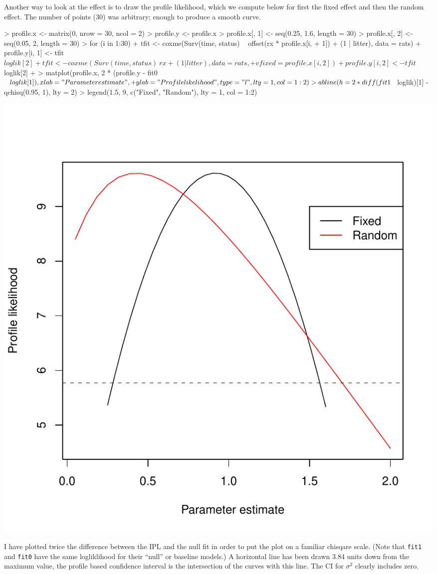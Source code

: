 \documentclass{article}
\begin{document}
Another way to look at the effect is to draw the profile likelihood,
which we compute below for first the fixed effect and then the  random effect.
The number of points (30) was arbitrary; enough to produce a smooth curve.
\begin{Schunk}
\begin{Sinput}
> profile.x <- matrix(0, nrow = 30, ncol = 2)
> profile.y <- profile.x
> profile.x[, 1] <- seq(0.25, 1.6, length = 30)
> profile.x[, 2] <- seq(0.05, 2, length = 30)
> for (i in 1:30) {
+     tfit <- coxme(Surv(time, status) ~ offset(rx * profile.x[i, 
+         1]) + (1 | litter), data = rats)
+     profile.y[i, 1] <- tfit$loglik[2]
+     tfit <- coxme(Surv(time, status) ~ rx + (1 | litter), data = rats, 
+         vfixed = profile.x[i, 2])
+     profile.y[i, 2] <- tfit$loglik[2]
+ }
> matplot(profile.x, 2 * (profile.y - fit0$loglik[1]), xlab = "Parameter estimate", 
+     ylab = "Profile likelihood", type = "l", lty = 1, col = 1:2)
> abline(h = 2 * diff(fit1$loglik)[1] - qchisq(0.95, 1), lty = 2)
> legend(1.5, 9, c("Fixed", "Random"), lty = 1, col = 1:2)
\end{Sinput}
\end{Schunk}
\includegraphics{intro-003}

I have plotted twice the difference between the IPL and the null fit in order to
put the plot on a familiar chisqare scale. (Note that \texttt{fit1} and \texttt{fit0} have
the same logliklihood for their ``null'' or baseline models.)
A horizontal line has been drawn 3.84 units down from the maximum value,
the profile based confidence interval is the intersection of the 
curves with this line.  The CI for $\sigma^2$ clearly includes zero.
\end{document}
